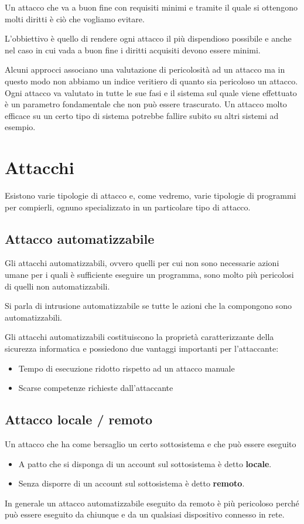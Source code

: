 Un attacco che va a buon fine con requisiti minimi e tramite il quale si ottengono molti diritti è ciò che vogliamo
evitare.

L'obbiettivo è quello di rendere ogni attacco il più dispendioso possibile e anche nel caso in cui vada a buon fine i
diritti acquisiti devono essere minimi.

Alcuni approcci associano una valutazione di pericolosità ad un attacco ma in questo modo non abbiamo un indice
veritiero di quanto sia pericoloso un attacco. Ogni attacco va valutato in tutte le sue fasi e il sistema sul quale
viene effettuato è un parametro fondamentale che non può essere trascurato. Un attacco molto efficace su un certo tipo
di sistema potrebbe fallire subito su altri sistemi ad esempio.

\section{Attacchi}
Esistono varie tipologie di attacco e, come vedremo, varie tipologie di programmi per compierli, ognuno specializzato
in un particolare tipo di attacco.

\subsection{Attacco automatizzabile}
Gli attacchi automatizzabili, ovvero quelli per cui non sono necessarie azioni umane per i quali è sufficiente eseguire
un programma, sono molto più pericolosi di quelli non automatizzabili.

Si parla di intrusione automatizzabile se tutte le azioni che la compongono sono automatizzabili.

Gli attacchi automatizzabili costituiscono la proprietà caratterizzante della sicurezza informatica e possiedono due
vantaggi importanti per l'attaccante:
\begin{itemize}
	\item Tempo di esecuzione ridotto rispetto ad un attacco manuale
	\item Scarse competenze richieste dall'attaccante
\end{itemize}

\subsection{Attacco locale / remoto}
Un attacco che ha come bersaglio un certo sottosistema e che può essere eseguito
\begin{itemize}
	\item A patto che si disponga di un account sul sottosistema è detto \textbf{locale}.
	\item Senza disporre di un account sul sottosistema è detto \textbf{remoto}.
\end{itemize}
In generale un attacco automatizzabile eseguito da remoto è più pericoloso perché può essere eseguito da chiunque e
da un qualsiasi dispositivo connesso in rete.

